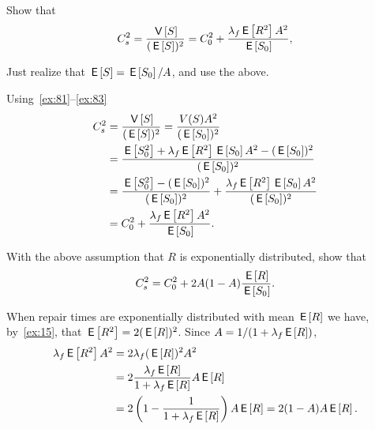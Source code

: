 \begin{exercise}
Show that
 \begin{equation*}
 C_s^2 = \frac{\V{S}}{(\E S)^2} = C_0^2 + \frac{\lambda_f \E{R^2} A^2}{\E{S_0}},
 \end{equation*}
\begin{hint} Just realize that $\E{S} = \E{S_0}/A$, and use the above.
\end{hint}
\begin{solution} Using~\cref{ex:81}--\cref{ex:83}
 \begin{align*}
C_s^2 &= \frac{\V{S}}{(\E S)^2} =\frac{V(S) A^2}{(\E{S_0})^2} \\
&=\frac{\E{S_0^2} + \lambda_f \E{R^2} \E{S_0}A^2 -(\E{S_0})^2}{(\E{S_0})^2} \\
&=\frac{\E{S_0^2} -(\E{S_0})^2}{(\E{S_0})^2} + \frac{\lambda_f \E{R^2} \E{S_0}A^2}{(\E{S_0})^2} \\
&=C_0^2 + \frac{\lambda_f \E{R^2}A^2}{\E{S_0}}.
 \end{align*}
\end{solution}
\end{exercise}


\begin{exercise}
With the above assumption that $R$ is exponentially distributed, show that
 \begin{equation*}
 C_s^2 = C_0^2 + 2 A(1-A) \frac{\E{R}}{\E{S_0}}.
 \end{equation*}
\begin{solution} 
When repair times are exponentially distributed with mean $\E{R}$ we have, by~\cref{ex:15}, that  $\E{R^2}=2(\E R)^2$. 
Since $A=1/(1+\lambda_f \E R)$, 
 \begin{equation*}
 \begin{split}
 \lambda_f \E{R^2} A^2 
&= 2\lambda_f (\E R)^2 A^2 \\ 
&= 2 \frac{\lambda_f \E R }{1+\lambda_f \E R} A \E R \\
&= 2 \left(1-\frac{1}{1+\lambda_f \E R}\right) A \E R = 2(1-A)A \E R.
 \end{split}
 \end{equation*}
\end{solution}
\end{exercise}







